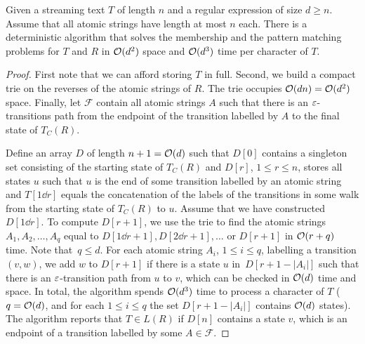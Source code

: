 \begin{claim}\label{claim:few_atomic_strings}
Given a streaming text $T$ of length $n$ and a regular expression of size $d \ge n$. Assume that all atomic strings have length at most $n$ each. There is a deterministic algorithm that solves the membership and the pattern matching problems for $T$ and $R$ in $\mathcal{O}(d^2)$ space and $\mathcal{O}(d^3)$ time per character of $T$. 
\end{claim}
\begin{proof}
First note that we can afford storing $T$ in full. Second, we build a compact trie on the reverses of the atomic strings of $R$. The trie occupies $\mathcal{O}(dn) = \mathcal{O}(d^2)$ space. Finally, let $\mathcal{F}$ contain all atomic strings $A$ such that there is an $\varepsilon$-transitions path from the endpoint of the transition labelled by $A$ to the final state of $T_C(R)$.

Define an array $D$ of length $n+1 = \mathcal{O}(d)$ such that $D[0]$ contains a singleton set consisting of the starting state of $T_C(R)$ and $D[r]$, $1 \le r \le n$, stores all states $u$ such that $u$ is the end of some transition labelled by an atomic string and $T[1\dd r]$ equals the concatenation of the labels of the transitions in some walk from the starting state of $T_C(R)$ to $u$. Assume that we have constructed $D[1\dd r]$. To compute $D[r+1]$, we use the trie to find the atomic strings $A_1, A_2, \ldots, A_q$ equal to $D[1\dd r+1], D[2\dd r+1], \ldots$  or $D[r+1]$ in $\mathcal{O}(r+q)$ time. Note that~$q \le d$. For each atomic string $A_i$, $1 \le i \le q$, labelling a transition $(v,w)$, we add $w$ to $D[r+1]$ if there is a state $u$ in~$D[r+1-|A_i|]$ such that there is an $\varepsilon$-transition path from $u$ to $v$, which can be checked in $\mathcal{O}(d)$ time and space. In total, the algorithm spends $\mathcal{O}(d^3)$ time to process a character of $T$ ($q = \mathcal{O}(d)$, and for each $1 \le i \le q$ the set $D[r+1-|A_i|]$ contains $\mathcal{O}(d)$ states). The algorithm reports that $T \in L(R)$ if $D[n]$ contains a state $v$, which is an endpoint of a transition labelled by some $A\in \mathcal{F}$.


\end{proof}

